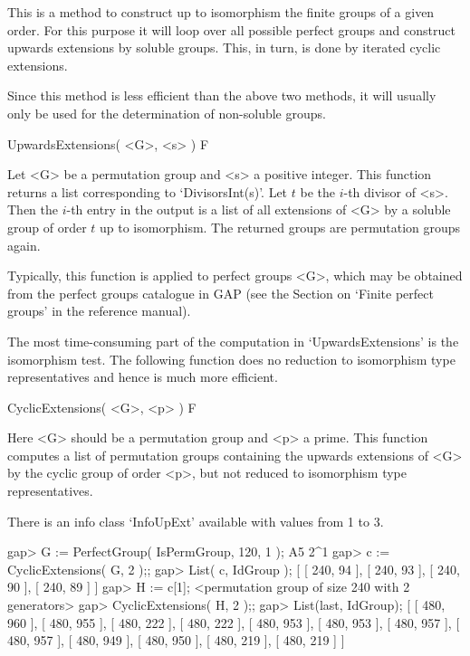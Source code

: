 


This is a method to construct up to isomorphism the finite groups of
a given order. For this purpose it will loop over all possible perfect
groups and construct upwards extensions by soluble groups. This, in turn, 
is done by iterated cyclic extensions.

Since this method is less efficient than the above two methods, it
will usually only be used for the determination of non-soluble groups.

\> UpwardsExtensions( <G>, <s> ) F

Let <G> be a permutation group and <s> a positive integer.  This function
returns a list corresponding to `DivisorsInt(s)'.  Let $t$ be the $i$-th 
divisor of <s>. Then the $i$-th entry in the output is a list of all 
extensions of <G> by a soluble group of order $t$ up to isomorphism. The 
returned groups are permutation groups again. 

Typically, this function is applied to perfect groups <G>, which may be 
obtained from the perfect groups catalogue in GAP (see the Section on
`Finite perfect groups' in the reference manual).

The most time-consuming part of the computation in `UpwardsExtensions'
is the isomorphism test. The following function does no reduction to
isomorphism type representatives and hence is much more efficient.

\> CyclicExtensions( <G>, <p> ) F

Here <G> should be a  permutation group and <p> a prime. This function 
computes a list of permutation groups containing the upwards extensions
of <G> by the cyclic group of order <p>, but not reduced to isomorphism
type representatives. 

There is an info class `InfoUpExt' available with values from 1 to 3.

\beginexample
gap> G := PerfectGroup( IsPermGroup, 120, 1 );
A5 2^1
gap> c := CyclicExtensions( G, 2 );;
gap> List( c, IdGroup );   
[ [ 240, 94 ], [ 240, 93 ], [ 240, 90 ], [ 240, 89 ] ]
gap> H := c[1];
<permutation group of size 240 with 2 generators>
gap> CyclicExtensions( H, 2 );;
gap> List(last, IdGroup);
[ [ 480, 960 ], [ 480, 955 ], [ 480, 222 ], [ 480, 222 ], [ 480, 953 ], 
  [ 480, 953 ], [ 480, 957 ], [ 480, 957 ], [ 480, 949 ], [ 480, 950 ], 
  [ 480, 219 ], [ 480, 219 ] ]

